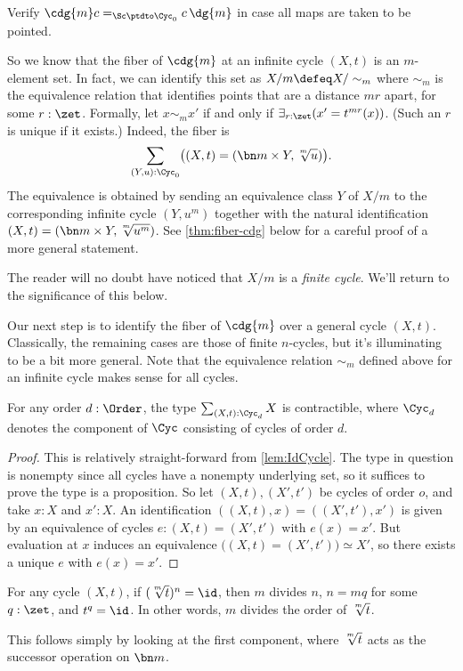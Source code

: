 \begin{xca}\label{xca:pointed-maps-circle}
Verify $\cdg{m}c=_{\Sc\ptdto\Cyc_0}c\,\dg{m}$ in case all maps are taken to be pointed.
\end{xca}

So we know that the fiber of $\cdg{m}$ at an infinite cycle $(X,t)$
is an $m$-element set. In fact, we can identify this set as
$X/m \defeq X/\sim_m$ where $\sim_m$ is the equivalence relation that
identifies points that are a distance $mr$ apart, for some $r:\zet$.
Formally, let $x\sim_m x'$ if and only if $\exists_{r:\zet}(x'=t^{mr}(x))$.
(Such an $r$ is unique if it exists.)
Indeed, the fiber is
\[
  \sum_{(Y,u):\Cyc_0}\bigl((X,t) = (\bn m\times Y, \sqrt[\uproot{2}m]{u})\bigr).
\]
The equivalence is obtained by sending an equivalence class $Y$ of $X/m$ to
the corresponding infinite cycle $(Y,u^m)$ together with the
natural identification $(X,t) = (\bn m\times Y, \sqrt[\uproot{2}m]{u^m})$.
See \cref{thm:fiber-cdg} below for a careful proof of a more general statement.

The reader will no doubt have noticed that $X/m$ is a \emph{finite cycle}.
We'll return to the significance of this below.

Our next step is to identify the fiber of $\cdg{m}$ over a general cycle $(X,t)$.
Classically, the remaining cases are those of finite $n$-cycles,
but it's illuminating to be a bit more general.
Note that the equivalence relation $\sim_m$ defined above for an infinite cycle
makes sense for all cycles.

\begin{lemma}\label{lem:sum-cycle-point-contr}
  For any order $d:\Order$, the type $\sum_{(X,t):\Cyc_d}X$ is contractible,
  where $\Cyc_d$ denotes the component of $\Cyc$ consisting
  of cycles of order $d$.
\end{lemma}
\begin{proof}
  This is relatively straight-forward from \cref{lem:IdCycle}.
  The type in question is nonempty since all cycles have a nonempty underlying set,
  so it suffices to prove the type is a proposition.
  So let $(X,t),(X',t')$ be cycles of order $o$, and take $x:X$ and $x':X$.
  An identification $((X,t),x) = ((X',t'),x')$ is given by an equivalence of
  cycles $e : (X,t)=(X',t')$ with $e(x)=x'$.
  But evaluation at $x$ induces an equivalence
  $\bigl((X,t)=(X',t')\bigr) \simeq X'$,
  so there exists a unique $e$ with $e(x)=x'$.
\end{proof}
\begin{lemma}\label{lem:m-root-id}
  For any cycle $(X,t)$, if $(\sqrt[\uproot{2}m]{t})^n = \id$,
  then $m$ divides $n$, \ie $n=mq$ for some $q:\zet$, and $t^q=\id$.
  In other words, $m$ divides the order of $\sqrt[\uproot{2}m]{t}$.
\end{lemma}
This follows simply by looking at the first component,
where $\sqrt[\uproot{2}m]{t}$ acts as the successor operation on $\bn m$.

